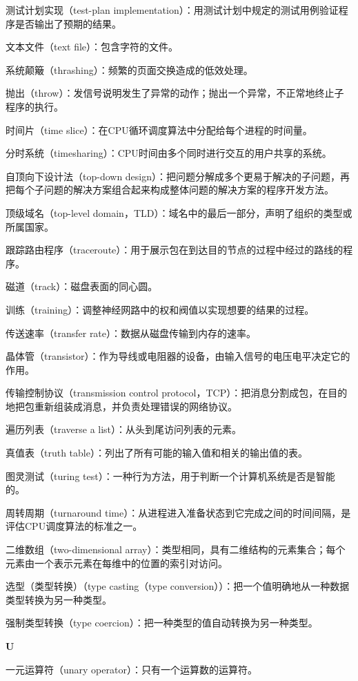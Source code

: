 测试计划实现（test-plan implementation）：用测试计划中规定的测试用例验证程序是否输出了预期的结果。

文本文件（text file）：包含字符的文件。

系统颠簸（thrashing）：频繁的页面交换造成的低效处理。

抛出（throw）：发信号说明发生了异常的动作；抛出一个异常，不正常地终止子程序的执行。

时间片（time slice）：在CPU循环调度算法中分配给每个进程的时间量。

分时系统（timesharing）：CPU时间由多个同时进行交互的用户共享的系统。

自顶向下设计法（top-down design）：把问题分解成多个更易于解决的子问题，再把每个子问题的解决方案组合起来构成整体问题的解决方案的程序开发方法。

顶级域名（top-level domain，TLD）：域名中的最后一部分，声明了组织的类型或所属国家。

跟踪路由程序（traceroute）：用于展示包在到达目的节点的过程中经过的路线的程序。

磁道（track）：磁盘表面的同心圆。

训练（training）：调整神经网路中的权和阀值以实现想要的结果的过程。

传送速率（transfer rate）：数据从磁盘传输到内存的速率。

晶体管（transistor）：作为导线或电阻器的设备，由输入信号的电压电平决定它的作用。

传输控制协议（transmission control protocol，TCP）：把消息分割成包，在目的地把包重新组装成消息，并负责处理错误的网络协议。

遍历列表（traverse a list）：从头到尾访问列表的元素。

真值表（truth table）：列出了所有可能的输入值和相关的输出值的表。

图灵测试（turing test）：一种行为方法，用于判断一个计算机系统是否是智能的。

周转周期（turnaround time）：从进程进入准备状态到它完成之间的时间间隔，是评估CPU调度算法的标准之一。

二维数组（two-dimensional array）：类型相同，具有二维结构的元素集合；每个元素由一个表示元素在每维中的位置的索引对访问。

选型（类型转换）（type casting（type conversion））：把一个值明确地从一种数据类型转换为另一种类型。

强制类型转换（type coercion）：把一种类型的值自动转换为另一种类型。

\textbf{U}

一元运算符（unary operator）：只有一个运算数的运算符。

